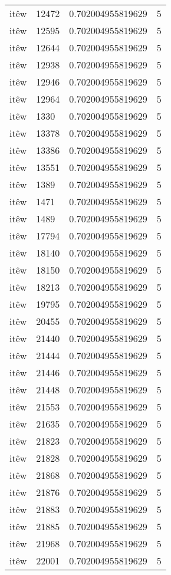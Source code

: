 \begin{longtable}{llll}
itêw & 12472 & 0.702004955819629 & 5\\
itêw & 12595 & 0.702004955819629 & 5\\
itêw & 12644 & 0.702004955819629 & 5\\
itêw & 12938 & 0.702004955819629 & 5\\
itêw & 12946 & 0.702004955819629 & 5\\
itêw & 12964 & 0.702004955819629 & 5\\
itêw & 1330 & 0.702004955819629 & 5\\
itêw & 13378 & 0.702004955819629 & 5\\
itêw & 13386 & 0.702004955819629 & 5\\
itêw & 13551 & 0.702004955819629 & 5\\
itêw & 1389 & 0.702004955819629 & 5\\
itêw & 1471 & 0.702004955819629 & 5\\
itêw & 1489 & 0.702004955819629 & 5\\
itêw & 17794 & 0.702004955819629 & 5\\
itêw & 18140 & 0.702004955819629 & 5\\
itêw & 18150 & 0.702004955819629 & 5\\
itêw & 18213 & 0.702004955819629 & 5\\
itêw & 19795 & 0.702004955819629 & 5\\
itêw & 20455 & 0.702004955819629 & 5\\
itêw & 21440 & 0.702004955819629 & 5\\
itêw & 21444 & 0.702004955819629 & 5\\
itêw & 21446 & 0.702004955819629 & 5\\
itêw & 21448 & 0.702004955819629 & 5\\
itêw & 21553 & 0.702004955819629 & 5\\
itêw & 21635 & 0.702004955819629 & 5\\
itêw & 21823 & 0.702004955819629 & 5\\
itêw & 21828 & 0.702004955819629 & 5\\
itêw & 21868 & 0.702004955819629 & 5\\
itêw & 21876 & 0.702004955819629 & 5\\
itêw & 21883 & 0.702004955819629 & 5\\
itêw & 21885 & 0.702004955819629 & 5\\
itêw & 21968 & 0.702004955819629 & 5\\
itêw & 22001 & 0.702004955819629 & 5\\

\end{longtable}
